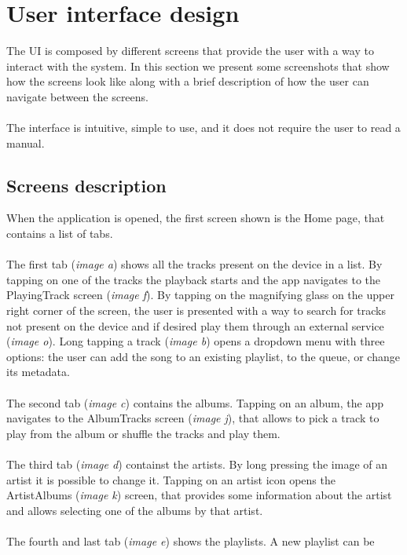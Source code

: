 \documentclass{article}
\begin{document}
\newpage

\section{User interface design}

The UI is composed by different screens that provide the user with a way to
interact with the system. In this section we present some screenshots that show
how the screens look like along with a brief description of how the user can
navigate between the screens.
\\\\
The interface is intuitive, simple to use, and it does not require the user to
read a manual.

\subsection{Screens description}
When the application is opened, the first screen shown is the Home page, that
contains a list of tabs.
\\\\
The first tab (\textit{image a}) shows all the tracks present on the device in a list. By
tapping on one of the tracks the playback starts and the app navigates to the
PlayingTrack screen (\textit{image f}). By tapping on the magnifying
glass on the upper right corner of the screen, the user is presented with a way
to search for tracks not present on the device and if desired play them through
an external service (\textit{image o}). Long tapping a track (\textit{image b}) opens
a dropdown menu with three options: the user can add the song to an existing
playlist, to the queue, or change its metadata.
\\\\
The second tab (\textit{image c}) contains the albums. Tapping on an album, the app
navigates to the AlbumTracks screen (\textit{image j}), that allows to pick a track to
play from the album or shuffle the tracks and play them.
\\\\
The third tab (\textit{image d}) containst the artists.  By long pressing the image of an
artist it is possible to change it. Tapping on an artist icon opens the
ArtistAlbums (\textit{image k}) screen, that provides some information about the artist
and allows selecting one of the albums by that artist.
\\\\
The fourth and last tab (\textit{image e}) shows the playlists. A new playlist can be
\end{document}
